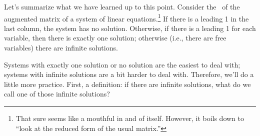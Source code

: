 %
%

%
%

Let's summarize what we have learned up to this point. Consider the \rref\ of the augmented matrix of a system of linear equations.\footnote{That sure seems like a mouthful in and of itself. However, it boils down to ``look at the reduced form of the usual matrix.''} If there is a leading 1 in the last column, the system has no solution. Otherwise, if there is a leading 1 for each variable, then there is exactly one solution; otherwise (i.e., there are free variables) there are infinite solutions.

Systems with exactly one solution or no solution are the easiest to deal with; systems with infinite solutions are a bit harder to deal with. Therefore, we'll do a little more practice. First, a definition: if there are infinite solutions, what do we call one of those infinite solutions?

\smallskip


